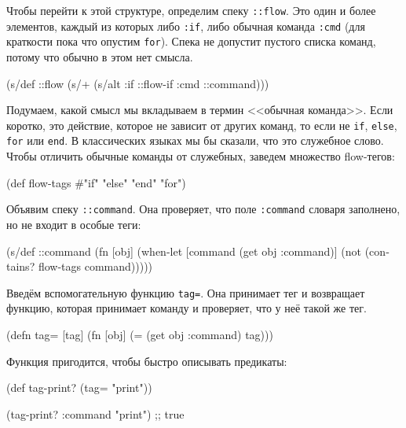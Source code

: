 Чтобы перейти к этой структуре, определим спеку \texttt{::flow}. Это один и
более элементов, каждый из которых либо \texttt{:if}, либо обычная команда
\texttt{:cmd} (для краткости пока что опустим \texttt{for}). Спека не допустит
пустого списка команд, потому что обычно в этом нет смысла.

\begin{english}
  \begin{clojure}
(s/def ::flow
  (s/+ (s/alt :if ::flow-if
              :cmd ::command)))
  \end{clojure}
\end{english}

Подумаем, какой смысл мы вкладываем в термин <<обычная команда>>. Если коротко,
это действие, которое не зависит от других команд, то если не \texttt{if},
\texttt{else}, \texttt{for} или \texttt{end}. В классических языках мы бы
сказали, что это служебное слово. Чтобы отличить обычные команды от служебных,
заведем множество flow-тегов:

\begin{english}
  \begin{clojure}
(def flow-tags #{"if" "else" "end" "for"})
  \end{clojure}
\end{english}

Объявим спеку \texttt{::command}. Она проверяет, что поле \texttt{:command}
словаря заполнено, но не входит в особые теги:

\begin{english}
  \begin{clojure}
(s/def ::command
  (fn [obj]
    (when-let [command (get obj :command)]
      (not (contains? flow-tags command)))))
  \end{clojure}
\end{english}

Введём вспомогательную функцию \texttt{tag=}. Она принимает тег и возвращает
функцию, которая принимает команду и проверяет, что у неё такой же тег.

\begin{english}
  \begin{clojure}
(defn tag= [tag]
  (fn [obj]
    (= (get obj :command) tag)))
  \end{clojure}
\end{english}

Функция пригодится, чтобы быстро описывать предикаты:

\begin{english}
  \begin{clojure}
(def tag-print? (tag= "print"))

(tag-print? {:command "print"})
;; true
  \end{clojure}
\end{english}

